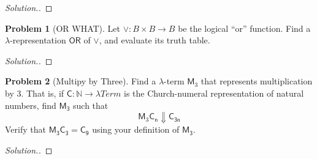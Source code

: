 \documentclass[11pt]{article}
\theoremstyle{theorem} %
\theoremstyle{definition} %
\newtheorem{problem}                    {{\color{BurntOrange}Problem}}
\theoremstyle{remark} %
\begin{document}
\begin{proof}
    [Solution.]
\end{proof}

\begin{problem}
    [OR WHAT]
    Let \(\vee \colon B \times B \to B\) be the logical ``or'' function. 
    Find a \(\lambda\)-representation \(\mathsf{OR}\) of \(\vee\), and evaluate its truth table.
\end{problem}

\begin{proof}
    [Solution.]
\end{proof}

\begin{problem}
    [Multipy by Three]
    Find a \(\lambda\)-term \(\mathsf{M}_3\) that represents multiplication by \(3\). 
    That is, if \(\mathsf{C} \colon \mathbb N \to \lambda\mathit{Term}\) is the Church-numeral representation of natural numbers, find \(\mathsf{M_3}\) such that 
    \[
        \mathsf{M}_3\mathsf{C_n} \Downarrow \mathsf{C_{3n}}
    \]
    Verify that \(\mathsf{M_3} \mathsf{C_3} = \mathsf{C_9}\) using your definition of \(\mathsf{M_3}\).
\end{problem}

\begin{proof}
    [Solution.]
\end{proof}
\end{document}

